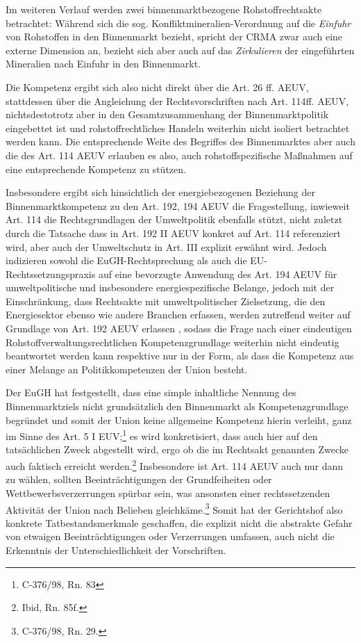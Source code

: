 \documentclass[12pt,a4paper,oneside]{book} %
\begin{document}
Im weiteren Verlauf werden zwei binnenmarktbezogene Rohstoffrechtsakte betrachtet: Während sich die sog. Konfliktmineralien-Verordnung auf die \textit{Einfuhr} von Rohstoffen in den Binnenmarkt bezieht, spricht der CRMA zwar auch eine externe Dimension an, bezieht sich aber auch auf das \textit{Zirkulieren} der eingeführten Mineralien nach Einfuhr in den Binnenmarkt.

Die Kompetenz ergibt sich also nicht direkt über die Art. 26 ff. AEUV, stattdessen über die Angleichung der Rechtsvorschriften nach Art. 114ff. AEUV, nichtsdestotrotz aber in den Gesamtzusammenhang der Binnenmarktpolitik eingebettet ist und rohstoffrechtliches Handeln weiterhin nicht isoliert betrachtet werden kann. Die entsprechende Weite des Begriffes des Binnenmarktes aber auch die des Art. 114 AEUV erlauben es also, auch rohstoffspezifische Maßnahmen auf eine entsprechende Kompetenz zu stützen.

Insbesondere ergibt sich hinsichtlich der energiebezogenen Beziehung der Binnenmarktkompetenz zu den Art. 192, 194 AEUV die Fragestellung, inwieweit Art. 114 die Rechtsgrundlagen der Umweltpolitik ebenfalls stützt, nicht zuletzt durch die Tatsache dass in Art. 192 II AEUV konkret auf Art. 114 referenziert wird, aber auch der Umweltschutz in Art. III explizit erwähnt wird.\autocite[siehe insbesondere hierzu Gundel §m Rn 28f]{dauses_handbuch_2024} Jedoch indizieren sowohl die EuGH-Rechtsprechung als auch die EU-Rechtssetzungspraxis auf eine bevorzugte Anwendung des Art. 194 AEUV für umweltpolitische und insbesondere energiespezifische Belange, jedoch mit der Einschränkung, dass \glqq Rechtsakte mit umweltpolitischer Zielsetzung, die den Energiesektor ebenso wie andere Branchen erfassen, werden zutreffend weiter auf Grundlage von Art. 192 AEUV erlassen \grqq\autocite[Gundel §m Rn 29]{dauses_handbuch_2024}, sodass die Frage nach einer eindeutigen Rohstoffverwaltungsrechtlichen Kompetenzgrundlage weiterhin nicht eindeutig beantwortet werden kann respektive nur in der Form, als dass die Kompetenz aus einer Melange an Politikkompetenzen der Union besteht.
	
Der EuGH hat festgestellt, dass eine simple inhaltliche Nennung des Binnenmarktziels nicht grundsätzlich den Binnenmarkt als Kompetenzgrundlage begründet und somit der Union keine allgemeine Kompetenz hierin verleiht, ganz im Sinne des Art. 5 I EUV;\footnote{C-376/98, Rn. 83} es wird konkretisiert, dass auch hier auf den tatsächlichen Zweck abgestellt wird, ergo ob die im Rechtsakt genannten Zwecke auch faktisch erreicht werden.\footnote{Ibid, Rn. 85f.} Insbesondere ist Art. 114 AEUV auch nur dann zu wählen, sollten Beeinträchtigungen der Grundfeiheiten oder Wettbewerbsverzerrungen spürbar sein, was ansonsten einer rechtssetzenden Aktivität der Union nach Belieben gleichkäme.\footnote{C-376/98, Rn. 29.} Somit hat der Gerichtshof also konkrete Tatbestandsmerkmale geschaffen, die explizit nicht die abstrakte Gefahr von etwaigen Beeinträchtigungen oder Verzerrungen umfassen, auch nicht die Erkenntnis der Unterschiedlichkeit der Vorschriften.\autocite[hierzu ausführlich]{Callies, Berliner Beiträge 117, S. 16}
\end{document}
